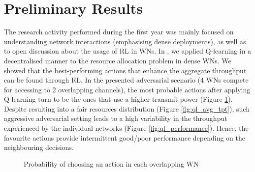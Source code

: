 \documentclass[12pt, a4paper,twoside]{tesi_upf}
\begin{document}
		\section{Preliminary Results}
		\label{section:preliminary_results}	
			The research activity performed during the first year was mainly focused on understanding network interactions (emphasising dense deployments), as well as to open discussion about the usage of RL in WNs. In \cite{wilhelmi2017implications}, we applied Q-learning in a decentralised manner to the resource allocation problem in dense WNs. We showed that the best-performing actions that enhance the aggregate throughput can be found through RL. In the presented adversarial scenario (4 WNs compete for accessing to 2 overlapping channels), the most probable actions after applying Q-learning turn to be the ones that use a higher transmit power (Figure \ref{fig:ql_actions}). Despite resulting into a fair resources distribution (Figure \ref{fig:ql_avg_tpt}), such aggressive adversarial setting leads to a high variability in the throughput experienced by the individual networks (Figure \ref{fig:ql_performance}). Hence, the favourite actions provide intermittent good/poor performance depending on the neighbouring decisions. 		
			\begin{figure}[h!]
				\centering
				\caption{Probability of choosing an action in each overlapping WN \cite{wilhelmi2017implications}}
				\label{fig:ql_actions}
			\end{figure}
\end{document}
